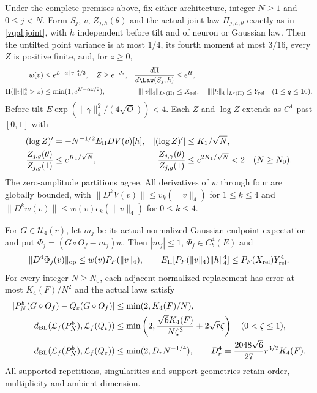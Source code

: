 \begin{theorem}\label{sva:relative-theorem}
Under the complete premises above, fix either architecture, integer
$N\ge1$ and $0\le j<N$. Form $S_j$, $v$, $Z_{j,h}(\theta)$ and the
actual joint law $\Pi_{j,h,\theta}$ exactly as in \eqref{vqal:joint},
with $h$ independent before tilt and of neuron or Gaussian law. Then the
untilted point variance is at most $1/4$, its fourth moment at most
$3/16$, every $Z$ is positive finite, and, for $z\ge0$,
\begin{align}\label{sva:moments}
 w(v)&\le e^{L-\alpha\|v\|_4^4/2},\quad Z\ge e^{-J_z},
 &{d\Pi\over d\Law(S_j,h)}&\le e^H,\nonumber\\
 \Pi(\|v\|_4^4>z)&\le\min(1,e^{H-\alpha z/2}),
 &\|\|v\|_4\|_{L^q(\Pi)}&\le X_{\rm rel},\quad
 \|\|h\|_4\|_{L^q(\Pi)}\le Y_{\rm rel}\quad(1\le q\le16).
\end{align}
Before tilt $E\exp(\|\gamma\|_4^2/(4\sqrt O))<4$.
Each $Z$ and $\log Z$ extends as $C^1$ past $[0,1]$ with
\begin{align}\label{sva:partitionratios}
 (\log Z)'&=-N^{-1/2}E_\Pi DV(v)[h],
 &| (\log Z)'|&\le K_1/\sqrt N,\nonumber\\
 {Z_{j,g}(\theta)\over Z_{j,g}(1)}&\le e^{K_1/\sqrt N},
 &{Z_{j,\gamma}(\theta)\over Z_{j,g}(1)}&\le e^{2K_1/\sqrt N}<2
 \quad(N\ge N_0).
\end{align}
The zero-amplitude partitions agree. All derivatives of $w$ through
four are globally bounded, with $\|D^kV(v)\|\le v_k(\|v\|_4)$ for
$1\le k\le4$ and $\|D^kw(v)\|\le w(v)e_k(\|v\|_4)$ for $0\le k\le4$.

For $G\in\mathcal U_4(r)$, let $m_j$ be its actual normalized Gaussian
endpoint expectation and put $\Phi_j=(G\circ O_f-m_j)w$. Then
$|m_j|\le1$, $\Phi_j\in C_b^4(E)$ and
\begin{equation}\label{sva:derivative}
 \|D^4\Phi_j(v)\|_{\rm op}\le w(v)P_F(\|v\|_4),\qquad
 E_\Pi[P_F(\|v\|_4)\|h\|_4^4]\le P_F(X_{\rm rel})Y_{\rm rel}^4.
\end{equation}
For every integer $N\ge N_0$, each adjacent normalized replacement has
error at most $K_4(F)/N^2$ and the actual laws satisfy
\begin{align}\label{sva:BL}
 |P_N^b(G\circ O_f)-Q_\varepsilon(G\circ O_f)|
 &\le\min(2,K_4(F)/N),\nonumber\\
 d_{\rm BL}(\mathcal L_f(P_N^b),\mathcal L_f(Q_\varepsilon))
 &\le\min\left(2,{\sqrt6K_4(F)\over N\zeta^3}
                         +2\sqrt r\zeta\right)\quad(0<\zeta\le1),\nonumber\\
 d_{\rm BL}(\mathcal L_f(P_N^b),\mathcal L_f(Q_\varepsilon))
 &\le\min(2,D_rN^{-1/4}),\qquad
 D_r^4={2048\sqrt6\over27}r^{3/2}K_4(F).
\end{align}
All supported repetitions, singularities and support geometries retain
order, multiplicity and ambient dimension.
\end{theorem}


